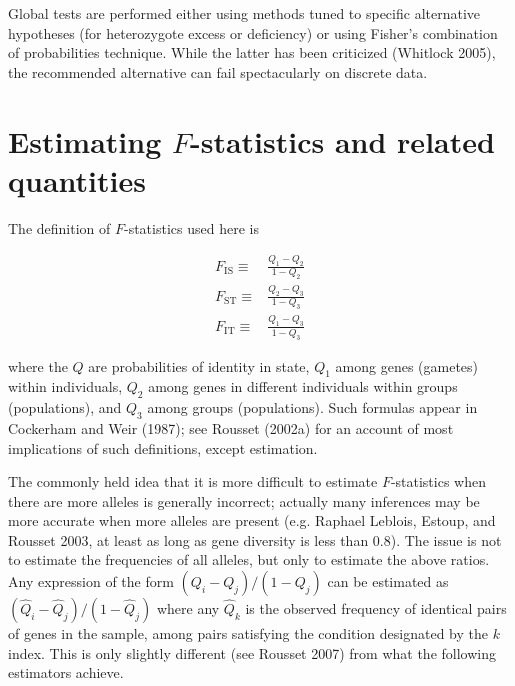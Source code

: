 \documentclass[
  12pt,
]{book}
\begin{document}
Global tests are performed either using methods tuned to specific alternative hypotheses (for heterozygote excess or deficiency) or using Fisher's combination of probabilities technique. While the latter has been criticized (Whitlock 2005), the recommended alternative can fail spectacularly on discrete data.

\hypertarget{estimating-f-statistics-and-related-quantities}{%
\section{\texorpdfstring{Estimating \(F\)-statistics and related quantities}{Estimating F-statistics and related quantities}}\label{estimating-f-statistics-and-related-quantities}}

The definition of \(F\)-statistics used here is

\[\begin{aligned}
 {F_\mathrm{IS}}\equiv &\frac{Q_1-Q_2}{1-Q_2}\\
 {F_\mathrm{ST}}\equiv &\frac{Q_2-Q_3}{1-Q_3}\\
 {F_\mathrm{IT}}\equiv &\frac{Q_1-Q_3}{1-Q_3}
 \end{aligned}\]

where the \(Q\) are probabilities of identity in state, \(Q_1\) among genes (gametes) within individuals, \(Q_2\) among genes in different individuals within groups (populations), and \(Q_3\) among groups (populations). Such formulas appear in Cockerham and Weir (1987); see Rousset (2002a) for an account of most implications of such definitions, except estimation.

The commonly held idea that it is more difficult to estimate \(F\)-statistics when there are more alleles is generally incorrect; actually many inferences may be more accurate when more alleles are present (e.g. Raphael Leblois, Estoup, and Rousset 2003, at least as long as gene diversity is less than 0.8). The issue is not to estimate the frequencies of all alleles, but only to estimate the above ratios. Any expression of the form \((Q_i-Q_j)/(1-Q_j)\) can be estimated as \((\hat{Q}_i-\hat{Q}_j)/(1-\hat{Q}_j)\) where any \(\hat{Q}_k\) is the observed frequency of identical pairs of genes in the sample, among pairs satisfying the condition designated by the \(k\) index. This is only slightly different (see Rousset 2007) from what the following estimators achieve.
\end{document}
